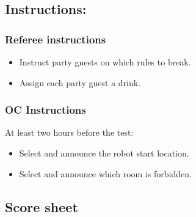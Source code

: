 \subsection*{Instructions:}
\subsubsection*{Referee instructions}

\begin{itemize}
	\item Instruct party guests on which rules to break.
	\item Assign each party guest a drink.
\end{itemize}

\subsubsection*{OC Instructions}
At least two hours before the test:
\begin{itemize}
	\item Select and announce the robot start location.
	\item Select and announce which room is forbidden.
\end{itemize}

\subsection*{Score sheet}



